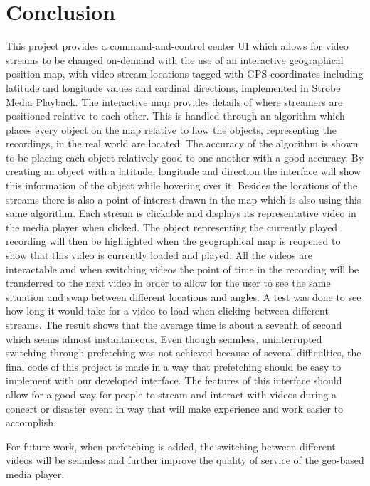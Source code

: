 \chapter{Conclusion}
\label{cha:conclusion}

This project provides a command-and-control center UI which allows for video streams to be changed on-demand with the use of an interactive geographical position map, with video stream locations tagged with GPS-coordinates including latitude and longitude values and cardinal directions, implemented in Strobe Media Playback. The interactive map provides details of where streamers are positioned relative to each other. This is handled through an algorithm which places every object on the map relative to how the objects, representing the recordings, in the real world are located. The accuracy of the algorithm is shown to be placing each object relatively good to one another with a good accuracy. By creating an object with a latitude, longitude and direction the interface will show this information of the object while hovering over it. Besides the locations of the streams there is also a point of interest drawn in the map which is also using this same algorithm. Each stream is clickable and displays its representative video in the media player when clicked. The object representing the currently played recording will then be highlighted when the geographical map is reopened to show that this video is currently loaded and played. All the videos are interactable and when switching videos the point of time in the recording will be transferred to the next video in order to allow for the user to see the same situation and swap between different locations and angles. A test was done to see how long it would take for a video to load when clicking between different streams. The result shows that the average time is about a seventh of second which seems almost instantaneous. Even though seamless, uninterrupted switching through prefetching was not achieved because of several difficulties, the final code of this project is made in a way that prefetching should be easy to implement with our developed interface. The features of this interface should allow for a good way for people to stream and interact with videos during a concert or disaster event in way that will make experience and work easier to accomplish. 

For future work, when prefetching is added, the switching between different videos will be seamless and further improve the quality of service of the geo-based media player.